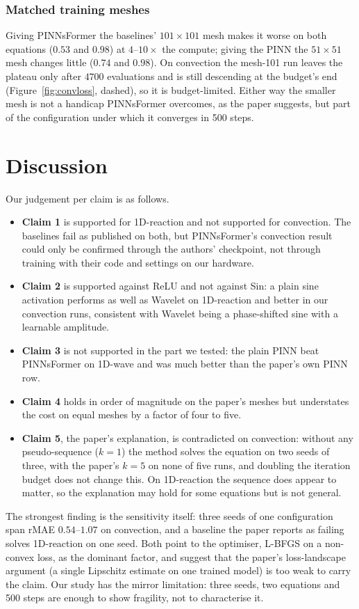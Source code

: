\documentclass[10pt]{article} %
\begin{document}
\subsubsection{Matched training meshes}
Giving PINNsFormer the baselines' $101\times101$ mesh makes it worse on both equations ($0.53$ and $0.98$) at $4$--$10\times$ the compute; giving the PINN the $51\times51$ mesh changes little ($0.74$ and $0.98$). On convection the mesh-101 run leaves the plateau only after $4700$ evaluations and is still descending at the budget's end (Figure~\ref{fig:convloss}, dashed), so it is budget-limited. Either way the smaller mesh is not a handicap PINNsFormer overcomes, as the paper suggests, but part of the configuration under which it converges in 500 steps.

\section{Discussion}
Our judgement per claim is as follows.
\begin{itemize}
    \item \textbf{Claim 1} is supported for 1D-reaction and not supported for convection. The baselines fail as published on both, but PINNsFormer's convection result could only be confirmed through the authors' checkpoint, not through training with their code and settings on our hardware.
    \item \textbf{Claim 2} is supported against ReLU and not against Sin: a plain sine activation performs as well as Wavelet on 1D-reaction and better in our convection runs, consistent with Wavelet being a phase-shifted sine with a learnable amplitude.
    \item \textbf{Claim 3} is not supported in the part we tested: the plain PINN beat PINNsFormer on 1D-wave and was much better than the paper's own PINN row.
    \item \textbf{Claim 4} holds in order of magnitude on the paper's meshes but understates the cost on equal meshes by a factor of four to five.
    \item \textbf{Claim 5}, the paper's explanation, is contradicted on convection: without any pseudo-sequence ($k=1$) the method solves the equation on two seeds of three, with the paper's $k=5$ on none of five runs, and doubling the iteration budget does not change this. On 1D-reaction the sequence does appear to matter, so the explanation may hold for some equations but is not general.
\end{itemize}
The strongest finding is the sensitivity itself: three seeds of one configuration span rMAE $0.54$--$1.07$ on convection, and a baseline the paper reports as failing solves 1D-reaction on one seed. Both point to the optimiser, L-BFGS on a non-convex loss, as the dominant factor, and suggest that the paper's loss-landscape argument (a single Lipschitz estimate on one trained model) is too weak to carry the claim. Our study has the mirror limitation: three seeds, two equations and 500 steps are enough to show fragility, not to characterise it.
\end{document}

